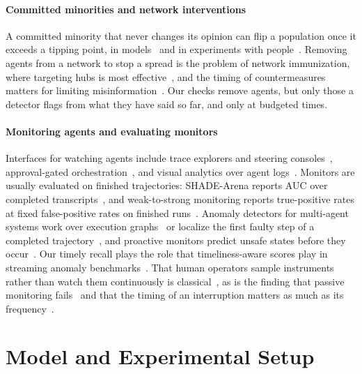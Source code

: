 \documentclass[pdflatex,sn-mathphys-num]{sn-jnl}
\theoremstyle{thmstyleone}%
\begin{document}
\paragraph{Committed minorities and network interventions}
A committed minority that never changes its opinion can flip a population once it exceeds a tipping point, in models~\cite{xie2011committed} and in experiments with people~\cite{centola2018tipping}. Removing agents from a network to stop a spread is the problem of network immunization, where targeting hubs is most effective~\cite{pastorsatorras2002immunization}, and the timing of countermeasures matters for limiting misinformation~\cite{budak2011limiting}. Our checks remove agents, but only those a detector flags from what they have said so far, and only at budgeted times.

\paragraph{Monitoring agents and evaluating monitors}
Interfaces for watching agents include trace explorers and steering consoles~\cite{epperson2025agdebugger,xie2024waitgpt,agentgui2026}, approval-gated orchestration~\cite{magneticui2025}, and visual analytics over agent logs~\cite{agentlens2025}. Monitors are usually evaluated on finished trajectories: SHADE-Arena reports AUC over completed transcripts~\cite{shadearena2025}, and weak-to-strong monitoring reports true-positive rates at fixed false-positive rates on finished runs~\cite{weaktostrong2025}. Anomaly detectors for multi-agent systems work over execution graphs~\cite{sentinelagent2025,gammaf2026} or localize the first faulty step of a completed trajectory~\cite{trajad2026}, and proactive monitors predict unsafe states before they occur~\cite{probguard2026}. Our timely recall plays the role that timeliness-aware scores play in streaming anomaly benchmarks~\cite{nab2015}. That human operators sample instruments rather than watch them continuously is classical~\cite{senders1964,sheridan1992}, as is the finding that passive monitoring fails~\cite{parasuraman1997} and that the timing of an interruption matters as much as its frequency~\cite{iqbal2007disruption}.

\section{Model and Experimental Setup}
\label{sec:model}
\end{document}
